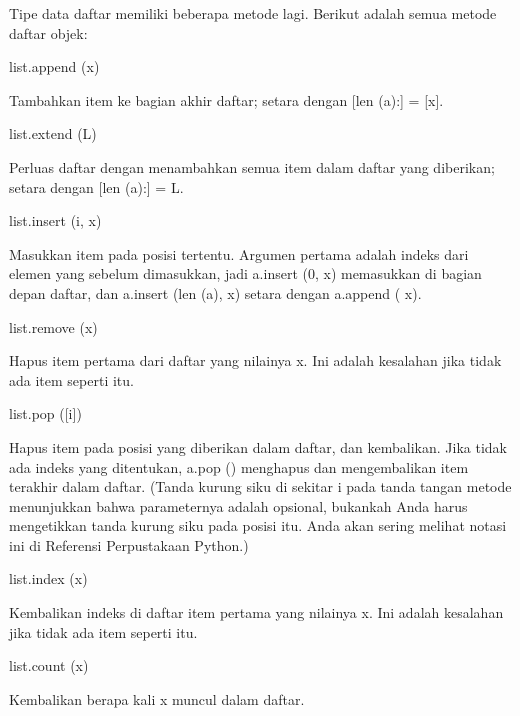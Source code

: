 \vspace{12pt}
\vspace{12pt}
\noindent 
Tipe data daftar memiliki beberapa metode lagi. Berikut adalah semua metode daftar objek: \par
\vspace{12pt}
\noindent 
list.append (x) \par
\noindent 
Tambahkan item ke bagian akhir daftar; setara dengan [len (a):] = [x]. \par
\vspace{12pt}
\noindent 
list.extend (L) \par
\noindent 
Perluas daftar dengan menambahkan semua item dalam daftar yang diberikan; setara dengan [len (a):] = L. \par
\vspace{12pt}
\noindent 
list.insert (i, x) \par
\noindent 
Masukkan item pada posisi tertentu. Argumen pertama adalah indeks dari elemen yang sebelum dimasukkan, jadi a.insert (0, x) memasukkan di bagian depan daftar, dan a.insert (len (a), x) setara dengan a.append ( x). \par
\vspace{12pt}
\noindent 
list.remove (x) \par
\noindent 
Hapus item pertama dari daftar yang nilainya x. Ini adalah kesalahan jika tidak ada item seperti itu. \par
\vspace{12pt}
\noindent 
list.pop ([i]) \par
\noindent 
Hapus item pada posisi yang diberikan dalam daftar, dan kembalikan. Jika tidak ada indeks yang ditentukan, a.pop () menghapus dan mengembalikan item terakhir dalam daftar. (Tanda kurung siku di sekitar i pada tanda tangan metode menunjukkan bahwa parameternya adalah opsional, bukankah Anda harus mengetikkan tanda kurung siku pada posisi itu. Anda akan sering melihat notasi ini di Referensi Perpustakaan Python.) \par
\vspace{12pt}
\noindent 
list.index (x) \par
\noindent 
Kembalikan indeks di daftar item pertama yang nilainya x. Ini adalah kesalahan jika tidak ada item seperti itu. \par
\vspace{12pt}
\noindent 
list.count (x) \par
\noindent 
Kembalikan berapa kali x muncul dalam daftar. \par
\vspace{12pt}
